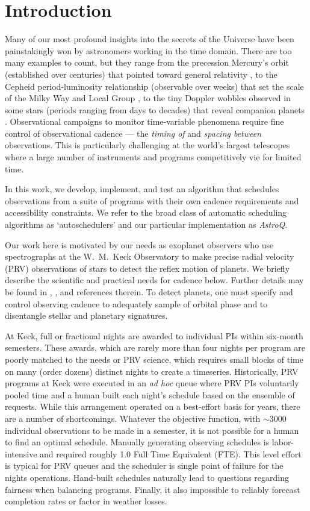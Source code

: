 \documentclass[twocolumn,linenumbers]{aastex63}
\begin{document}
\section{Introduction}
\label{Intro}
Many of our most profound insights into the secrets of the Universe have been painstakingly won by astronomers working in the time domain. There are too many examples to count, but they range from the precession Mercury's orbit (established over centuries) that pointed toward general relativity \citep{LeVerrier59}, to the Cepheid period-luminosity relationship (observable over weeks) that set the scale of the Milky Way and Local Group \citep{Leavitt12}, to the tiny Doppler wobbles observed in some stars (periods ranging from days to decades) that reveal companion planets \citep{Mayor95}. Observational campaigns to monitor time-variable phenomena require fine control of observational cadence --- the {\em timing of} and {\em spacing between} observations. This is particularly challenging at the world's largest telescopes where a large number of instruments and programs competitively vie for limited time. 

In this work, we develop, implement, and test an algorithm that schedules observations from a suite of programs with their own cadence requirements and accessibility constraints. We refer to the broad class of automatic scheduling algorithms as `autoschedulers' and our particular implementation as {\em AstroQ}. 

Our work here is motivated by our needs as exoplanet observers who use spectrographs at the W.~M.~Keck Observatory to make precise radial velocity (PRV) observations of stars to detect the reflex motion of planets. We briefly describe the scientific and practical needs for cadence below. Further details may be found in \citet{kpfcc}, \citet{Handley2024_Semester}, and references therein. To detect planets, one must specify and control observing cadence to adequately sample of orbital phase and to disentangle stellar and planetary signatures.

At Keck, full or fractional nights are awarded to individual PIs within six-month semesters. These awards, which are rarely more than four nights per program are poorly matched to the needs or PRV science, which requires small blocks of time on many (order dozens) distinct nights to create a timeseries. Historically, PRV programs at Keck were executed in an {\em ad hoc} queue where PRV PIs voluntarily pooled time and a human built each night's schedule based on the ensemble of requests. While this arrangement operated on a best-effort basis for years, there are a number of shortcomings. Whatever the objective function, with $\sim$3000 individual observations to be made in a semester, it is not possible for a human to find an optimal schedule. Manually generating observing schedules is labor-intensive and required roughly 1.0 Full Time Equivalent (FTE). This level effort is typical for PRV queues \citep{kpfcc} and the scheduler is single point of failure for the nights operations. Hand-built schedules naturally lead to questions regarding fairness when balancing programs. Finally, it also impossible to reliably forecast completion rates or factor in weather losses.
\end{document}
